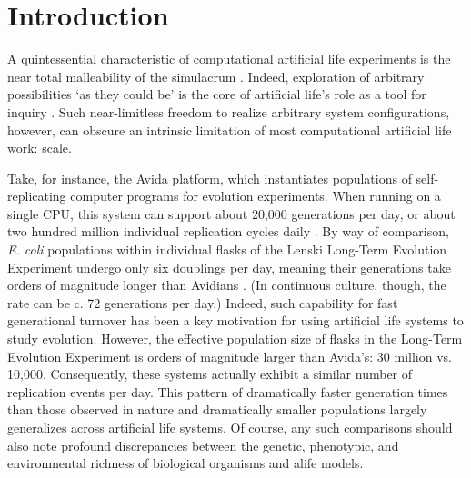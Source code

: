 \section{Introduction}



A quintessential characteristic of computational artificial life experiments is the near total malleability of the simulacrum \citep{pattee1989simulations}.
Indeed, exploration of arbitrary possibilities `as they could be' is the core of artificial life's role as a tool for inquiry \citep{langton1997artificial}.
Such near-limitless freedom to realize arbitrary system configurations, however, can obscure an intrinsic limitation of most computational artificial life work: scale.

Take, for instance, the Avida platform, which instantiates populations of self-replicating computer programs for evolution experiments.
When running on a single CPU, this system can support about 20,000 generations per day, or about two hundred million individual replication cycles daily \citep{ofria2009artificial}.
By way of comparison, \textit{E. coli} populations within individual flasks of the Lenski Long-Term Evolution Experiment undergo only six doublings per day, meaning their generations take orders of magnitude longer than Avidians \citep{good2017dynamics}.
(In continuous culture, though, the rate can be c. 72 generations per day.)
Indeed, such capability for fast generational turnover has been a key motivation for using artificial life systems to study evolution.
However, the effective population size of flasks in the Long-Term Evolution Experiment is orders of magnitude larger than Avida's: 30 million vs. 10,000.
Consequently, these systems actually exhibit a similar number of replication events per day.
This pattern of dramatically faster generation times than those observed in nature and dramatically smaller populations largely generalizes across artificial life systems.
Of course, any such comparisons should also note profound discrepancies between the genetic, phenotypic, and environmental richness of biological organisms and alife models.

